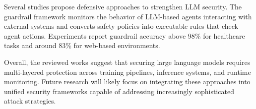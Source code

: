 \documentclass[12pt]{article}
\begin{document}
Several studies propose defensive approaches to strengthen LLM security. The guardrail framework \cite{guardagent} monitors the behavior of LLM-based agents interacting with external systems and converts safety policies into executable rules that check agent actions. Experiments report guardrail accuracy above 98\% for healthcare tasks and around 83\% for web-based environments.

Overall, the reviewed works suggest that securing large language models requires multi-layered protection across training pipelines, inference systems, and runtime monitoring. Future research will likely focus on integrating these approaches into unified security frameworks capable of addressing increasingly sophisticated attack strategies.



\end{document}
